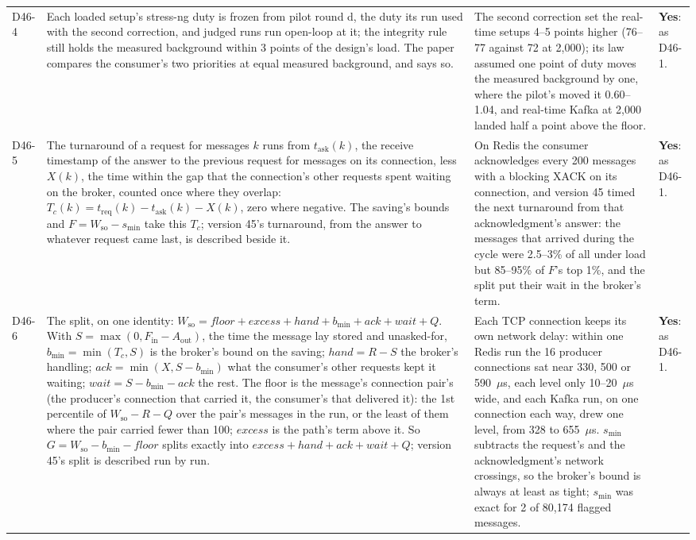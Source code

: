 \documentclass[11pt]{article}
\begin{document}
{\begin{longtable}{@{}p{1.1cm} >{\raggedright\arraybackslash}p{6.1cm} >{\raggedright\arraybackslash}p{6.0cm} >{\raggedright\arraybackslash}p{2.2cm}@{}}
D46-4 & Each loaded setup's stress-ng duty is frozen from pilot round d, the duty its run used with the second correction, and judged runs run open-loop at it; the integrity rule still holds the measured background within 3 points of the design's load. The paper compares the consumer's two priorities at equal measured background, and says so. & The second correction set the real-time setups 4--5 points higher (76--77 against 72 at 2,000); its law assumed one point of duty moves the measured background by one, where the pilot's moved it 0.60--1.04, and real-time Kafka at 2,000 landed half a point above the floor. & \textbf{Yes}: as D46-1. \\
D46-5 & The turnaround of a request for messages $k$ runs from $t_{\mathrm{ask}}(k)$, the receive timestamp of the answer to the previous request for messages on its connection, less $X(k)$, the time within the gap that the connection's other requests spent waiting on the broker, counted once where they overlap: $T_c(k) = t_{\mathrm{req}}(k) - t_{\mathrm{ask}}(k) - X(k)$, zero where negative. The saving's bounds and $F = W_{\mathrm{so}} - s_{\min}$ take this $T_c$; version 45's turnaround, from the answer to whatever request came last, is described beside it. & On Redis the consumer acknowledges every 200 messages with a blocking XACK on its connection, and version 45 timed the next turnaround from that acknowledgment's answer: the messages that arrived during the cycle were 2.5--3\% of all under load but 85--95\% of $F$'s top 1\%, and the split put their wait in the broker's term. & \textbf{Yes}: as D46-1. \\
D46-6 & The split, on one identity: $W_{\mathrm{so}} = \mathit{floor} + \mathit{excess} + \mathit{hand} + b_{\min} + \mathit{ack} + \mathit{wait} + Q$. With $S = \max(0, F_{\mathrm{in}} - A_{\mathrm{out}})$, the time the message lay stored and unasked-for, $b_{\min} = \min(T_c, S)$ is the broker's bound on the saving; $\mathit{hand} = R - S$ the broker's handling; $\mathit{ack} = \min(X, S - b_{\min})$ what the consumer's other requests kept it waiting; $\mathit{wait} = S - b_{\min} - \mathit{ack}$ the rest. The floor is the message's connection pair's (the producer's connection that carried it, the consumer's that delivered it): the 1st percentile of $W_{\mathrm{so}} - R - Q$ over the pair's messages in the run, or the least of them where the pair carried fewer than 100; $\mathit{excess}$ is the path's term above it. So $G = W_{\mathrm{so}} - b_{\min} - \mathit{floor}$ splits exactly into $\mathit{excess} + \mathit{hand} + \mathit{ack} + \mathit{wait} + Q$; version 45's split is described run by run. & Each TCP connection keeps its own network delay: within one Redis run the 16 producer connections sat near 330, 500 or 590~$\mu$s, each level only 10--20~$\mu$s wide, and each Kafka run, on one connection each way, drew one level, from 328 to 655~$\mu$s. $s_{\min}$ subtracts the request's and the acknowledgment's network crossings, so the broker's bound is always at least as tight; $s_{\min}$ was exact for 2 of 80,174 flagged messages. & \textbf{Yes}: as D46-1. \\

\end{longtable}}
\end{document}
